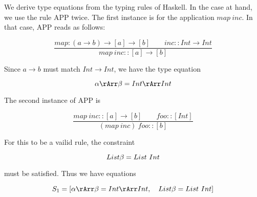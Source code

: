 We derive type equations from the typing rules of Haskell.  In the case at hand, we use the rule APP twice.  The first instance is for the application $map\ inc$.  In that case, APP reads as follows:

\begin{equation}
\frac{map : (a \to b) \to [a] \to [b] \qquad inc :: Int \to Int }{map\ inc :: [a] \to [b]}
\end{equation}

Since $a \to b$ must match $Int \to Int$, we have the type equation

\begin{equation}
\alpha \rArr \beta = Int \rArr Int
\end{equation}

The second instance of APP is 

\begin{equation}
\frac{map\ inc :: [a] \to [b] \qquad foo :: [Int]}{(map\ inc)\ foo :: [b]}
\end{equation}

For this to be a vailid rule, the constraint 

\begin{equation}
List\space \beta = List\ Int
\end{equation}


 must be satisfied.  Thus we have equations

\begin{equation}
S_1 = [\alpha \rArr \beta = Int \rArr Int, \quad List\space \beta = List\ Int]
\end{equation}




\bigskip



\bigskip


